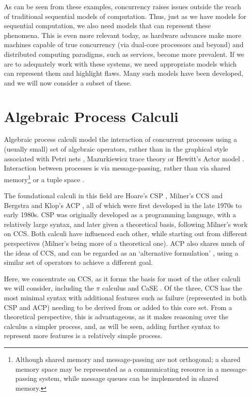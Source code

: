 As can be seen from these examples, concurrency raises issues outside
the reach of traditional sequential models of computation.  Thus, just
as we have models for sequential computation, we also need models that
can represent these phenomena.  This is even more relevant today, as
hardware advances make more machines capable of true concurrency (via
dual-core processors and beyond) and distributed computing paradigms,
such as services, become more prevalent.  If we are to adequately work
with these systems, we need appropriate models which can represent them
and highlight flaws.  Many such models have been developed, and we will
now consider a subset of these.

\section{Algebraic Process Calculi}

Algebraic process calculi model the interaction of concurrent processes
using a (usually small) set of algebraic operators, rather than in the
graphical style associated with Petri nets \cite{petri:phd},
Mazurkiewicz trace theory \cite{maz:trace} or Hewitt's Actor model
\cite{hewitt:actor}.  Interaction between processes is via
message-passing, rather than via shared memory\footnote{Although shared
memory and message-passing are not orthogonal; a shared memory space may
be represented as a communicating resource in a message-passing system,
while message queues can be implemented in shared memory.} or a tuple
space \cite{linda}.

The foundational calculi in this field are Hoare's CSP \cite{hoare:csp78},
Milner's CCS \cite{ccs} and Bergstra and Klop's ACP \cite{acp}, all of
which were first developed in the late 1970s to early 1980s.  CSP was
originally developed as a programming language, with a relatively large
syntax, and later given a theoretical basis, following Milner's work on
CCS.  Both calculi have influenced each other, while starting out from
different perspectives (Milner's being more of a theoretical one).  ACP
also shares much of the ideas of CCS, and can be regarded as an
`alternative formulation' \cite{acp}, using a similar set of operators
to achieve a different goal.

Here, we concentrate on CCS, as it forms the basis for most of the other
calculi we will consider, including the $\pi$ calculus
\cite{picalctutorial} and CaSE \cite{CaSE}.  Of the three, CCS has the
most minimal syntax with additional features such as failure
(represented in both CSP and ACP) needing to be derived from or added to
this core set.  From a theoretical perspective, this is advantageous, as
it makes reasoning over the calculus a simpler process, and, as will be
seen, adding further syntax to represent more features is a relatively
simple process.

